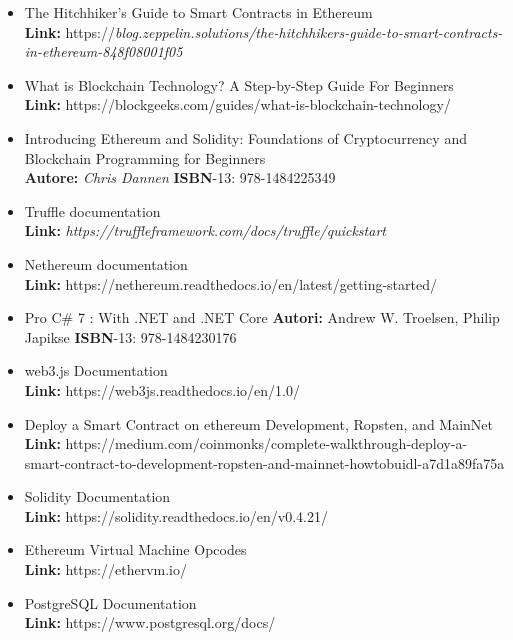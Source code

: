 \documentclass[11pt]{thesistemp}
\begin{document}
\pagebreak


\begin{itemize}
	\item The Hitchhiker’s Guide to Smart Contracts in Ethereum\\ 
	\textbf{Link:} https://\textit{blog.zeppelin.solutions/the-hitchhikers-guide-to-smart-contracts-in-ethereum-848f08001f05}
	\item What is Blockchain Technology? A Step-by-Step Guide For Beginners\\
	\textbf{Link:} https://blockgeeks.com/guides/what-is-blockchain-technology/
	\item Introducing Ethereum and Solidity: Foundations of Cryptocurrency and Blockchain Programming for Beginners\\
	\textbf{Autore:} \textit{Chris Dannen} \textbf{ISBN}-13: 978-1484225349
	\item Truffle documentation\\
	\textbf{Link:} \textit{https://truffleframework.com/docs/truffle/quickstart}
	\item Nethereum documentation\\
	\textbf{Link:} https://nethereum.readthedocs.io/en/latest/getting-started/
	\item Pro C\# 7 : With .NET and .NET Core
	\textbf{Autori:} Andrew W. Troelsen, Philip Japikse \textbf{ISBN}-13: 978-1484230176
	\item web3.js Documentation\\
	\textbf{Link:} https://web3js.readthedocs.io/en/1.0/
	\item Deploy a Smart Contract on ethereum Development, Ropsten, and MainNet \\
	\textbf{Link:} https://medium.com/coinmonks/complete-walkthrough-deploy-a-smart-contract-to-development-ropsten-and-mainnet-howtobuidl-a7d1a89fa75a
	\item Solidity Documentation\\
	\textbf{Link:} https://solidity.readthedocs.io/en/v0.4.21/
	\item Ethereum Virtual Machine Opcodes\\
	\textbf{Link:} https://ethervm.io/
	\item PostgreSQL Documentation\\
	\textbf{Link:} https://www.postgresql.org/docs/
\end{itemize}
\end{document}
